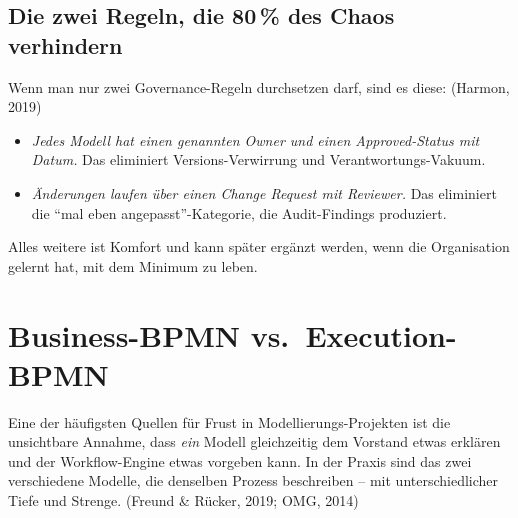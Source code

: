 \documentclass[11pt,a4paper,oneside]{article}
\newcommand{\quelle}[1]{{\footnotesize\color{lpGray}(#1)}}
\begin{document}
\subsection{Die zwei Regeln, die 80\,\% des Chaos verhindern}

Wenn man nur zwei Governance-Regeln durchsetzen darf, sind es diese: \quelle{Harmon, 2019}

\begin{itemize}
  \item \emph{Jedes Modell hat einen genannten Owner und einen Approved-Status mit Datum.} Das eliminiert Versions-Verwirrung und Verantwortungs-Vakuum.
  \item \emph{Änderungen laufen über einen Change Request mit Reviewer.} Das eliminiert die ``mal eben angepasst''-Kategorie, die Audit-Findings produziert.
\end{itemize}

Alles weitere ist Komfort und kann später ergänzt werden, wenn die Organisation gelernt hat, mit dem Minimum zu leben.

\section{Business-BPMN vs.\ Execution-BPMN}

Eine der häufigsten Quellen für Frust in Modellierungs-Projekten ist die unsichtbare Annahme, dass \emph{ein} Modell gleichzeitig dem Vorstand etwas erklären und der Workflow-Engine etwas vorgeben kann. In der Praxis sind das zwei verschiedene Modelle, die denselben Prozess beschreiben -- mit unterschiedlicher Tiefe und Strenge. \quelle{Freund \& Rücker, 2019; OMG, 2014}
\end{document}
